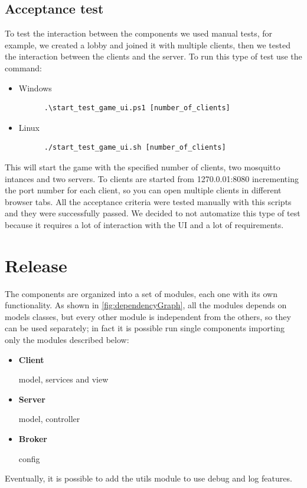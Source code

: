\documentclass{scrartcl}
\begin{document}
\subsection{Acceptance test}\label{acceptance-test}
To test the interaction between the components we used manual tests, for example, we created a lobby and joined it with multiple clients, then we tested the interaction between the clients and the server.
To run this type of test use the command:
\begin{itemize}
      \item Windows
      \begin{verbatim}
      .\start_test_game_ui.ps1 [number_of_clients]
      \end{verbatim}
      \item Linux
      \begin{verbatim}
      ./start_test_game_ui.sh [number_of_clients]
      \end{verbatim}
\end{itemize}
This will start the game with the specified number of clients, two mosquitto intances and two servers.
To clients are started from 1270.0.01:8080 incrementing the port number for each client, so you can open multiple clients in different browser tabs.\newline
All the acceptance criteria were tested manually with this scripts and they were successfully passed.\newline
We decided to not automatize this type of test because it requires a lot of interaction with the UI and a lot of requirements.

\section{Release}\label{release}

The components are organized into a set of modules, each one with its own functionality.
As shown in \cref{fig:dependencyGraph}, all the modules depends on models classes, but every other module is independent from the others, so they can be used separately; in fact it is possible run single components importing only the modules described below:
\begin{itemize}
      \item \textbf{Client}\par
            model, services and view
      \item \textbf{Server}\par
            model, controller
      \item \textbf{Broker}\par
            config
\end{itemize}
Eventually, it is possible to add the utils module to use debug and log features.
\end{document}
